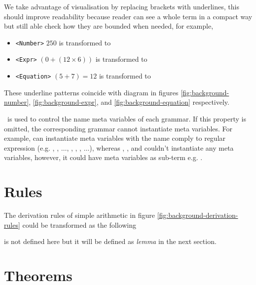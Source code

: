 \documentclass[master.tex]{subfiles}
\begin{document}
We take advantage of visualisation by replacing brackets with underlines, this
should improve readability because reader can see a whole term in a compact
way but still able check how they are bounded when needed, for example,
\begin{itemize}
\item \texttt{<Number>} $250$ is transformed to
   
\item \texttt{<Expr>} $(0 + (12 \times 6))$ is transformed to
   
\item \texttt{<Equation>} $(5 + 7) = 12$ is transformed to
   
\end{itemize}
These underline patterns coincide with diagram in figures
\ref{fig:background-number}, \ref{fig:background-expr}, and
\ref{fig:background-equation} respectively.

\kMetaVarRegex\ is used to control the name meta variables of each grammar. If
this property is omitted, the corresponding grammar cannot instantiate meta
variables. For example,  can instantiate meta variables with the name
comply to regular expression \pregex{\texttt{[a-z][0-9]*}} (e.g. , ,
$\ldots$, , , , $\ldots$), whereas ,
, and  couldn't instantiate any meta variables,
however, it could have meta variables as sub-term e.g. 
.

\section{Rules}

The derivation rules of simple arithmetic in figure \ref{fig:background-derivation-rules}
could be transformed as the following

 is not defined here but it will be defined as \emph{lemma}
in the next section.

\section{Theorems}
\end{document}
